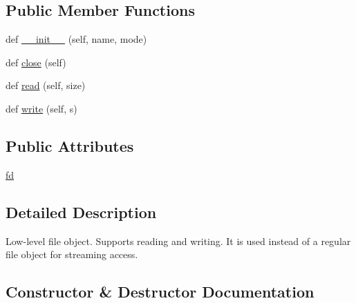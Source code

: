 \subsection*{Public Member Functions}
\begin{DoxyCompactItemize}
\item 
def \hyperlink{classpip_1_1__vendor_1_1distlib_1_1__backport_1_1tarfile_1_1__LowLevelFile_ac6ac2a8213a87fa17764964946c80572}{\+\_\+\+\_\+init\+\_\+\+\_\+} (self, name, mode)
\item 
def \hyperlink{classpip_1_1__vendor_1_1distlib_1_1__backport_1_1tarfile_1_1__LowLevelFile_a373205504dfbb24ed49d8be2afe5754a}{close} (self)
\item 
def \hyperlink{classpip_1_1__vendor_1_1distlib_1_1__backport_1_1tarfile_1_1__LowLevelFile_a3ad756afdcb4932bc3f05fe5e9f435e6}{read} (self, size)
\item 
def \hyperlink{classpip_1_1__vendor_1_1distlib_1_1__backport_1_1tarfile_1_1__LowLevelFile_a1814570a609484b5b9b26e82fa261be2}{write} (self, s)
\end{DoxyCompactItemize}
\subsection*{Public Attributes}
\begin{DoxyCompactItemize}
\item 
\hyperlink{classpip_1_1__vendor_1_1distlib_1_1__backport_1_1tarfile_1_1__LowLevelFile_afd6b14590ef22395826be4d32be9ca8c}{fd}
\end{DoxyCompactItemize}


\subsection{Detailed Description}
\begin{DoxyVerb}Low-level file object. Supports reading and writing.
   It is used instead of a regular file object for streaming
   access.
\end{DoxyVerb}
 

\subsection{Constructor \& Destructor Documentation}
\mbox{\label{classpip_1_1__vendor_1_1distlib_1_1__backport_1_1tarfile_1_1__LowLevelFile_ac6ac2a8213a87fa17764964946c80572}} 
